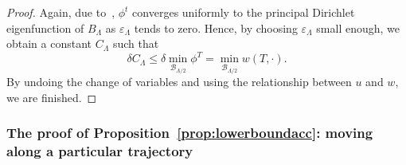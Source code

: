 \documentclass[11pt]{article}    %
\renewcommand{\epsilon}{\varepsilon}
\begin{document}
\begin{proof}
Again, due to~\cite[Lemma 5.1]{BHR_Acceleration}, $\phi^t$ converges uniformly to the principal Dirichlet eigenfunction of $B_\Lambda$ as $\epsilon_\Lambda$ tends to zero.  Hence, by choosing $\epsilon_\Lambda$ small enough, we obtain a constant $C_\Lambda$ such that
\[
	\delta C_\Lambda
		\leq \delta \min_{\mathcal{B}_{\Lambda/2}} \phi^T
		=  \min_{\mathcal{B}_{\Lambda/2}} w(T,\cdot).
\]
By undoing the change of variables and using the relationship between $u$ and $w$, we are finished.
\end{proof}


















\subsubsection*{The proof of Proposition~\ref{prop:lowerboundacc}: moving along a particular trajectory}
\end{document}
